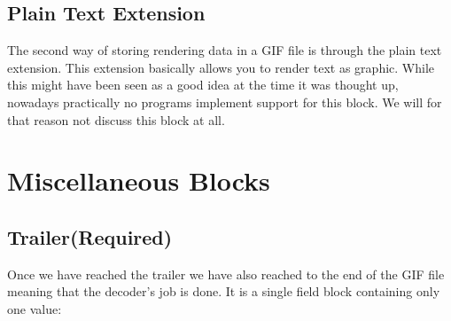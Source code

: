 \begin{algorithm}[H]
\begin{algorithmic}[1]
    \EndIf

    \Else
    \EndIf

    \State {}



    \State {}

    \EndIf
    \EndIf



    \EndWhile

  \end{algorithmic}
\end{algorithm}

\subsection{Plain Text Extension}

The second way of storing rendering data in a GIF file is through the
plain text extension. This extension basically allows you to render
text as graphic. While this might have been seen as a good idea at the
time it was thought up, nowadays practically no programs implement
support for this block. We will for that reason not discuss this
block at all.

\section{Miscellaneous Blocks}

\subsection{Trailer(Required)}

Once we have reached the trailer we have also reached to the end of
the GIF file meaning that the decoder's job is done. It is a single
field block containing only one value:

